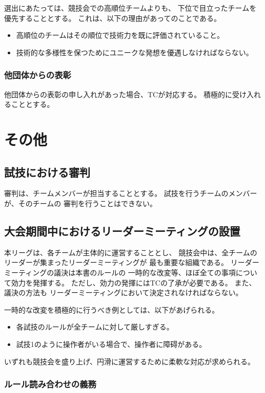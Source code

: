 \documentclass[a4j]{jarticle}
\begin{document}
選出にあたっては、競技会での高順位チームよりも、
下位で目立ったチームを優先することとする。
これは、以下の理由があってのことである。
\begin{itemize}
	\item 高順位のチームはその順位で技術力を既に評価されていること。
	\item 技術的な多様性を保つためにユニークな発想を優遇しなければならない。
\end{itemize}

\subsubsection{他団体からの表彰}

他団体からの表彰の申し入れがあった場合、TCが対応する。
積極的に受け入れることとする。

\section{その他}

\subsection{試技における審判}

審判は、チームメンバーが担当することとする。
試技を行うチームのメンバーが、そのチームの
審判を行うことはできない。

\subsection{大会期間中におけるリーダーミーティングの設置}

本リーグは、各チームが主体的に運営することとし、
競技会中は、全チームのリーダーが集まったリーダーミーティングが
最も重要な組織である。
リーダーミーティングの議決は本書のルールの
一時的な改変等、ほぼ全ての事項について効力を発揮する。
ただし、効力の発揮にはTCの了承が必要である。
また、議決の方法も
リーダーミーティングにおいて決定されなければならない。


一時的な改変を積極的に行うべき例としては、以下があげられる。
\begin{itemize}
	\item 各試技のルールが全チームに対して厳しすぎる。
	\item 試技1のように操作者がいる場合で、操作者に障碍がある。
\end{itemize}
いずれも競技会を盛り上げ、円滑に運営するために柔軟な対応が求められる。

\subsubsection{ルール読み合わせの義務}
\end{document}
